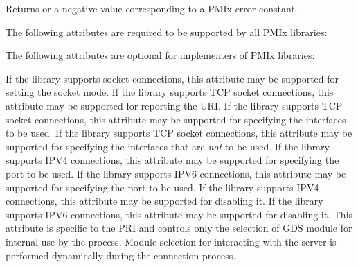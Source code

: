 Returns  or a negative value corresponding to a PMIx error constant.

\reqattrstart
The following attributes are required to be supported by all \ac{PMIx} libraries:


\reqattrend

\optattrstart
The following attributes are optional for implementers of \ac{PMIx} libraries:

 If the library supports socket connections, this attribute may be supported for setting the socket mode.
\pasteAttributeItemEnd{}
 If the library supports TCP socket connections, this attribute may be supported for reporting the URI.
\pastePRIAttributeItemEnd{}
 If the library supports TCP socket connections, this attribute may be supported for specifying the interfaces to be used.
\pastePRIAttributeItemEnd{}
 If the library supports TCP socket connections, this attribute may be supported for specifying the interfaces that are \textit{not} to be used.
\pastePRIAttributeItemEnd{}
 If the library supports IPV4 connections, this attribute may be supported for specifying the port to be used.
\pastePRIAttributeItemEnd{}
 If the library supports IPV6 connections, this attribute may be supported for specifying the port to be used.
\pastePRIAttributeItemEnd{}
 If the library supports IPV4 connections, this attribute may be supported for disabling it.
\pastePRIAttributeItemEnd{}
 If the library supports IPV6 connections, this attribute may be supported for disabling it.
\pastePRIAttributeItemEnd{}
 This attribute is specific to the \ac{PRI} and controls only the selection of \ac{GDS} module for internal use by the process. Module selection for interacting with the server is performed dynamically during the connection process.
\pastePRIAttributeItemEnd{}

